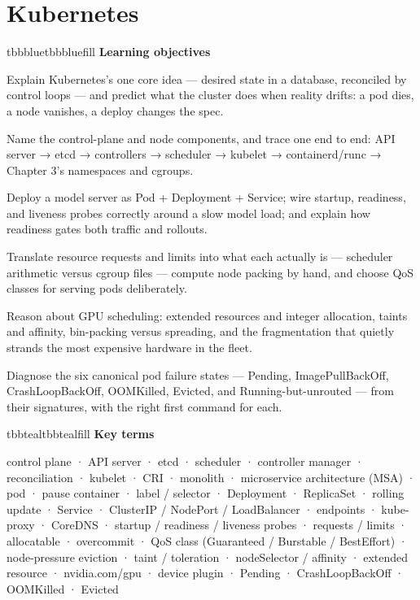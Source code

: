 \setcounter{chapter}{4}
\chapter{Kubernetes}

\begin{calloutbox}{tbbblue}{tbbbluefill}
{\normalsize\bfseries\color{tbbblue}Learning objectives}\par\vspace{3pt}
\begin{tbbitemize}
  \item Explain Kubernetes's one core idea — desired state in a database, reconciled by control loops — and predict what the cluster does when reality drifts: a pod dies, a node vanishes, a deploy changes the spec.
  \item Name the control-plane and node components, and trace one  end to end: API server → etcd → controllers → scheduler → kubelet → containerd/runc → Chapter 3's namespaces and cgroups.
  \item Deploy a model server as Pod + Deployment + Service; wire startup, readiness, and liveness probes correctly around a slow model load; and explain how readiness gates both traffic and rollouts.
  \item Translate resource requests and limits into what each actually is — scheduler arithmetic versus cgroup files — compute node packing by hand, and choose QoS classes for serving pods deliberately.
  \item Reason about GPU scheduling: extended resources and integer allocation, taints and affinity, bin-packing versus spreading, and the fragmentation that quietly strands the most expensive hardware in the fleet.
  \item Diagnose the six canonical pod failure states — Pending, ImagePullBackOff, CrashLoopBackOff, OOMKilled, Evicted, and Running-but-unrouted — from their signatures, with the right first command for each.
\end{tbbitemize}
\end{calloutbox}

\vspace{5.0pt}

\begin{calloutbox}{tbbteal}{tbbtealfill}
{\normalsize\bfseries\color{tbbteal}Key terms}\par\vspace{3pt}
control plane · API server · etcd · scheduler · controller manager · reconciliation · kubelet · CRI · monolith · microservice architecture (MSA) · pod · pause container · label / selector · Deployment · ReplicaSet · rolling update · Service · ClusterIP / NodePort / LoadBalancer · endpoints · kube-proxy · CoreDNS · startup / readiness / liveness probes · requests / limits · allocatable · overcommit · QoS class (Guaranteed / Burstable / BestEffort) · node-pressure eviction · taint / toleration · nodeSelector / affinity · extended resource · nvidia.com/gpu · device plugin · Pending · CrashLoopBackOff · OOMKilled · Evicted
\end{calloutbox}

